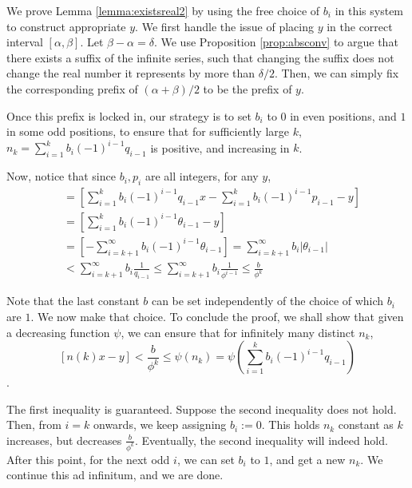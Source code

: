 We prove Lemma \ref{lemma:existsreal2} by using the free choice of $b_i$ in this system to construct appropriate $y$. We first handle the issue of placing $y$ in the correct interval $[\alpha, \beta]$. Let $\beta - \alpha = \delta$. We use Proposition \ref{prop:absconv} to argue that there exists a suffix of the infinite series, such that changing the suffix does not change the real number it represents by more than $\delta/2$. Then, we can simply fix the corresponding prefix of $(\alpha + \beta)/2$ to be the prefix of $y$.

Once this prefix is locked in, our strategy is to set $b_i$ to $0$ in even positions, and $1$ in some odd positions, to ensure that for sufficiently large $k$, $n_k = \sum_{i=1}^k b_i (-1)^{i-1}q_{i-1}$ is positive, and increasing in $k$.

Now, notice that since $b_i, p_i$ are all integers, for any $y$,
\begin{align*}
[n_kx - y] &= \left[\sum_{i=1}^k b_i (-1)^{i-1}q_{i-1}x - \sum_{i=1}^k b_i (-1)^{i-1}p_{i-1} - y\right] \\
&= \left[\sum_{i=1}^k b_i (-1)^{i-1}\theta_{i-1} - y\right] \\
&= \left[- \sum_{i=k+1}^\infty b_i (-1)^{i-1}\theta_{i-1} \right] = \sum_{i=k+1}^\infty b_i |\theta_{i-1} |\\
&< \sum_{i=k+1}^\infty b_i \frac{1}{q_{i-1}} \le \sum_{i=k+1}^\infty b_i \frac{1}{\phi^{i-1}} \le \frac{b}{\phi^k}
\end{align*}

Note that the last constant $b$ can be set independently of the choice of which $b_i$ are $1$. We now make that choice. To conclude the proof, we shall show that given a decreasing function $\psi$, we can ensure that for infinitely many distinct $n_k$, 
$$[n(k)x - y] < \frac{b}{\phi^k} \le \psi(n_k) = \psi\left(\sum_{i=1}^k b_i (-1)^{i-1}q_{i-1}\right)$$.

The first inequality is guaranteed. Suppose the second inequality does not hold. Then, from $i = k$ onwards, we keep assigning $b_i := 0$. This holds $n_k$ constant as $k$ increases, but decreases $\frac{b}{\phi^k}$. Eventually, the second inequality will indeed hold. After this point, for the next odd $i$, we can set $b_i$ to $1$, and get a new $n_k$. We continue this ad infinitum, and we are done.